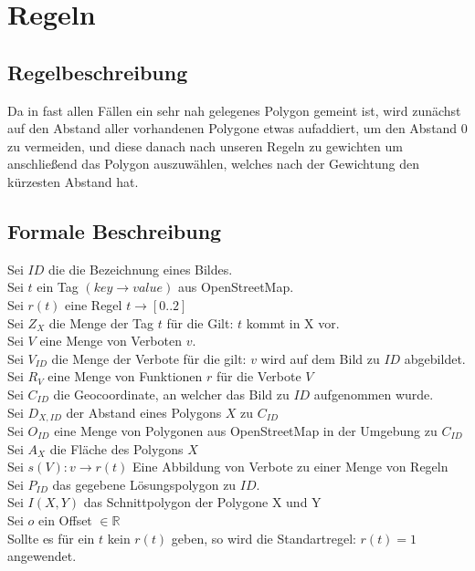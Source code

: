 \section{Regeln}
\label{sec:Regeln}

\subsection{Regelbeschreibung}
Da in fast allen Fällen ein sehr nah gelegenes Polygon gemeint ist, wird zunächst auf den Abstand aller vorhandenen Polygone etwas aufaddiert,
um den Abstand 0 zu vermeiden, und diese danach nach unseren Regeln zu gewichten um anschließend das Polygon auszuwählen,
welches nach der Gewichtung den kürzesten Abstand hat.



\subsection{Formale Beschreibung}
Sei $ID$ die die Bezeichnung eines Bildes.\\
Sei $t$ ein Tag $(key \to value)$ aus OpenStreetMap.\\
Sei $r(t)$ eine Regel $t \to [0..2]$ \\
Sei $Z_{X}$ die Menge der Tag $t$ für die Gilt: $t$ kommt in X vor. \\
Sei $V$ eine Menge von Verboten $v$.\\
Sei $V_{ID}$ die Menge der Verbote für die gilt: $v$ wird auf dem Bild zu $ID$ abgebildet.\\
Sei $R_V$ eine Menge von Funktionen $r$ für die Verbote $V$\\
Sei $C_{ID}$ die Geocoordinate, an welcher das Bild zu $ID$ aufgenommen wurde. \\
Sei $D_{X,ID}$ der Abstand eines Polygons $X$ zu $C_{ID}$ \\
Sei $O_{ID}$ eine Menge von Polygonen aus OpenStreetMap in der Umgebung zu $C_{ID}$\\
Sei $A_{X}$ die Fläche des Polygons $X$\\
Sei $s(V) : v \to r(t)$  Eine Abbildung von Verbote zu einer Menge von Regeln\\
Sei $P_{ID}$ das gegebene Lösungspolygon zu $ID$.\\
Sei $I(X,Y)$ das Schnittpolygon der Polygone X und Y\\
Sei $o$ ein Offset $\in \mathbb{R}$
\\
Sollte es für ein $t$ kein $r(t)$ geben, so wird die Standartregel:
$r(t) = 1$ angewendet.

